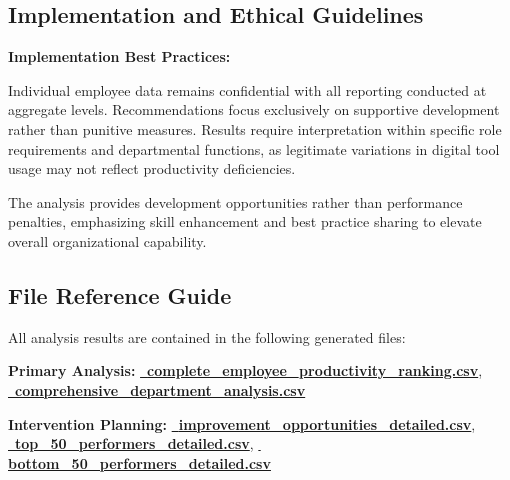 \documentclass[12pt,a4paper]{article}
\begin{document}
\subsection*{Implementation and Ethical Guidelines}

\begin{warningbox}
\textbf{Implementation Best Practices:}

Individual employee data remains confidential with all reporting conducted at aggregate levels. Recommendations focus exclusively on supportive development rather than punitive measures. Results require interpretation within specific role requirements and departmental functions, as legitimate variations in digital tool usage may not reflect productivity deficiencies.

The analysis provides development opportunities rather than performance penalties, emphasizing skill enhancement and best practice sharing to elevate overall organizational capability.
\end{warningbox}

\subsection*{File Reference Guide}

All analysis results are contained in the following generated files:

\textbf{Primary Analysis:} \textcolor{primaryGold}{\href{https://fixysaskihumorizijuv.supabase.co/storage/v1/object/public/research-files/10c10921-f037-476a-a3e2-443b4f24dacd-complete_employee_productivity_ranking.csv?download=}{{\normalsize\faTrophy}\, \textbf{complete\_employee\_productivity\_ranking.csv}}}, \\
\textcolor{primaryBlue}{\href{https://fixysaskihumorizijuv.supabase.co/storage/v1/object/public/research-files/c063886e-6e70-476c-b87d-de0dc3c0f2b9-comprehensive_department_analysis.csv?download=}{{\normalsize\faBuilding}\, \textbf{comprehensive\_department\_analysis.csv}}}

\textbf{Intervention Planning:} \textcolor{successGreen}{\href{https://fixysaskihumorizijuv.supabase.co/storage/v1/object/public/research-files/03f82764-e85b-4f1f-b127-04cb7347bd2b-improvement_opportunities_detailed.csv?download=}{{\normalsize\faCheckCircle}\, \textbf{improvement\_opportunities\_detailed.csv}}}, \\
\textcolor{accentGold}{\href{https://fixysaskihumorizijuv.supabase.co/storage/v1/object/public/research-files/d7107b00-7e41-4006-a14b-1bd782f73914-top_50_performers_detailed.csv?download=}{{\normalsize\faMedal}\, \textbf{top\_50\_performers\_detailed.csv}}}, \textcolor{dangerRed}{\href{https://fixysaskihumorizijuv.supabase.co/storage/v1/object/public/research-files/82454a51-b4a9-4f64-b213-29ce048aad16-bottom_50_performers_detailed.csv?download=}{{\normalsize\faWarning}\, \textbf{bottom\_50\_performers\_detailed.csv}}}
\end{document}
